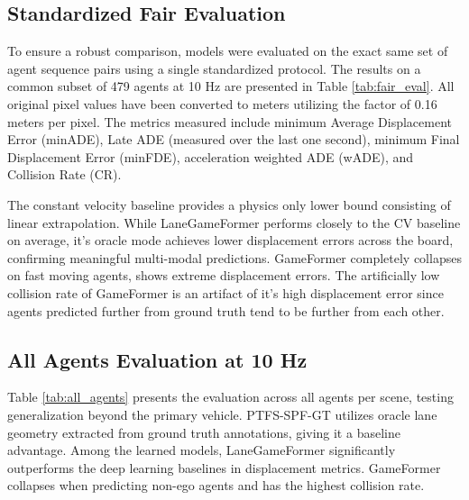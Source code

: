 \documentclass{article}
\begin{document}
\subsection{Standardized Fair Evaluation}
To ensure a robust comparison, models were evaluated on the exact same set of agent sequence pairs using a single standardized protocol. The results on a common subset of 479 agents at 10 Hz are presented in Table \ref{tab:fair_eval}. All original pixel values have been converted to meters utilizing the factor of 0.16 meters per pixel. The metrics measured include minimum Average Displacement Error (minADE), Late ADE (measured over the last one second), minimum Final Displacement Error (minFDE), acceleration weighted ADE (wADE), and Collision Rate (CR).

\begin{table}[htbp]
\centering
\caption{Standardized Fair Evaluation (479 Agents)}
\label{tab:fair_eval}
\end{table}

The constant velocity baseline provides a physics only lower bound consisting of linear extrapolation. While LaneGameFormer performs closely to the CV baseline on average, it's oracle mode achieves lower displacement errors across the board, confirming meaningful multi-modal predictions. GameFormer completely collapses on fast moving agents, shows extreme displacement errors. The artificially low collision rate of GameFormer is an artifact of it's high displacement error since agents predicted further from ground truth tend to be further from each other.

\subsection{All Agents Evaluation at 10 Hz}
Table \ref{tab:all_agents} presents the evaluation across all agents per scene, testing generalization beyond the primary vehicle. PTFS-SPF-GT utilizes oracle lane geometry extracted from ground truth annotations, giving it a baseline advantage. Among the learned models, LaneGameFormer significantly outperforms the deep learning baselines in displacement metrics. GameFormer collapses when predicting non-ego agents and has the highest collision rate.
\end{document}
